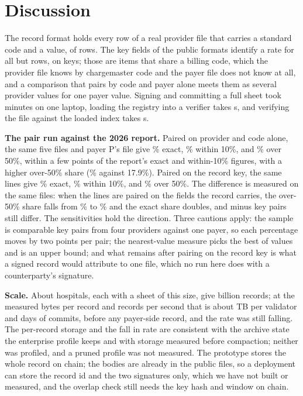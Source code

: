 \documentclass[10pt]{article}
\begin{document}
\section*{Discussion}

The record format holds every row of a real provider file that carries a standard code and a value, \sheetVerifyLines{} of \sheetRows{} rows. The key fields of the public formats identify a rate for all but \sheetCollisions{} rows, on \sheetKeysMulti{} keys; those are items that share a billing code, which the provider file knows by chargemaster code and the payer file does not know at all, and a comparison that pairs by code and payer alone meets them as several provider values for one payer value. Signing and committing a full sheet took \sheetTotalMin{} minutes on one laptop, loading the registry into a verifier takes \sheetLoadS{} s, and verifying the file against the loaded index takes \sheetVerifyS{} s.

\textbf{The pair run against the 2026 report.} Paired on provider and code alone, the same five files and payer P's file give \coarseExact\% exact, \coarseWithinTen\% within 10\%, and \coarseOverFifty\% over 50\%, within a few points of the report's exact and within-10\% figures, with a higher over-50\% share (\coarseOverFifty\% against 17.9\%). Paired on the record key, the same lines give \pairLineExact\% exact, \pairLineWithinTen\% within 10\%, and \pairLineOverFifty\% over 50\%. The difference is measured on the same files: when the lines are paired on the fields the record carries, the over-50\% share falls from \coarseOverFifty\% to \pairLineOverFifty\% and the exact share doubles, and \pairLineComparable{} minus \pairLineExactCount{} key pairs still differ. The sensitivities hold the direction. Three cautions apply: the sample is \pairLineComparable{} comparable key pairs from four providers against one payer, so each percentage moves by two points per pair; the nearest-value measure picks the best of \pairValuesPerKey{} values and is an upper bound; and what remains after pairing on the record key is what a signed record would attribute to one file, which no run here does with a counterparty's signature.

\textbf{Scale.} About \projHospitals{} hospitals, each with a sheet of this size, give \projRecordsB{} billion records; at the measured \sheetDiskBytes{} bytes per record and \sheetRecPerS{} records per second that is about \projDiskTB{} TB per validator and \projCommitDays{} days of commits, before any payer-side record, and the rate was still falling. The per-record storage and the fall in rate are consistent with the archive state the enterprise profile keeps and with storage measured before compaction; neither was profiled, and a pruned profile was not measured. The prototype stores the whole record on chain; the bodies are already in the public files, so a deployment can store the record id and the two signatures only, which we have not built or measured, and the overlap check still needs the key hash and window on chain.
\end{document}
